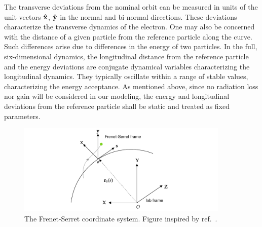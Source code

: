 The transverse deviations from the nominal orbit can be measured in units of the unit vectors $\vu{x}$, $\vu{y}$ in the normal and bi-normal directions. These deviations characterize the transverse dynamics of the electron. One may also be concerned with the distance of a given particle from the reference particle along the curve. Such differences arise due to differences in the energy of two particles. In the full, six-dimensional dynamics, the longitudinal distance from the reference particle and the energy deviations are conjugate dynamical variables characterizing the longitudinal dynamics. They typically oscillate within a range of stable values, characterizing the energy acceptance. As mentioned above, since no radiation loss nor gain will be considered in our modeling, the energy and longitudinal deviations from the reference particle shall be static and treated as fixed parameters.

\begin{figure}[htb]
    \centering
    \includegraphics[width=0.9\textwidth]{Images/frenetserret.pdf}
    \caption[The Frenet-Serret coordinate system]{The Frenet-Serret coordinate system. Figure inspired by ref.~\cite{huang_beam-based_2019}.}
    \label{fig:frenet-serret}
\end{figure}

